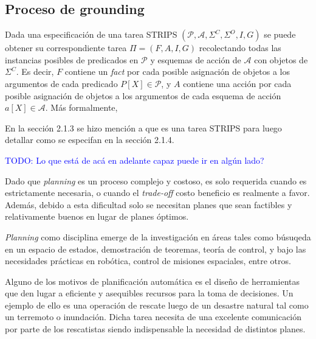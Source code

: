 \subsection{Proceso de grounding}

Dada una especificación de una tarea STRIPS $(\mathcal{P}, \mathcal{A},
\Sigma^{C}, \Sigma^{O}, I, G)$ se puede obtener su correspondiente tarea $\Pi =
(F, A, I, G)$ recolectando todas las instancias posibles de predicados en
$\mathcal{P}$ y esquemas de acción de $\mathcal{A}$ con objetos de $\Sigma^{C}$.
Es decir, $F$ contiene un \emph{fact} por cada posible asignación de objetos a
los argumentos de cada predicado $P[X] \in \mathcal{P}$, y $A$ contiene una
acción por cada posible asignación de objetos a los argumentos de cada esquema
de acción $a[X] \in \mathcal{A}$. Más formalmente,



En la sección 2.1.3 se hizo mención a que es una tarea STRIPS para luego
detallar como se especifan en la sección 2.1.4. 


\textcolor{blue}{TODO: Lo que está de acá en adelante capaz puede ir en algún lado?}

Dado que \emph{planning} es un proceso complejo y costoso, es solo requerida
cuando es estrictamente necesaria, o cuando el \emph{trade-off} costo beneficio
es realmente a favor. Además, debido a esta dificultad solo se necesitan planes
que sean factibles y relativamente buenos en lugar de planes óptimos.

\emph{Planning} como disciplina emerge de la investigación en áreas tales como
búsuqeda en un espacio de estados, demostración de teoremas, teoría de control,
y bajo las necesidades prácticas en robótica, control de misiones espaciales,
entre otros.

Alguno de los motivos de planificación automática es el diseño de herramientas
que den lugar a eficiente y asequibles recursos para la toma de decisiones. Un
ejemplo de ello es una operación de rescate luego de un desastre natural tal
como un terremoto o inundación. Dicha tarea necesita de una excelente
comunicación por parte de los rescatistas siendo indispensable la necesidad de
distintos planes.